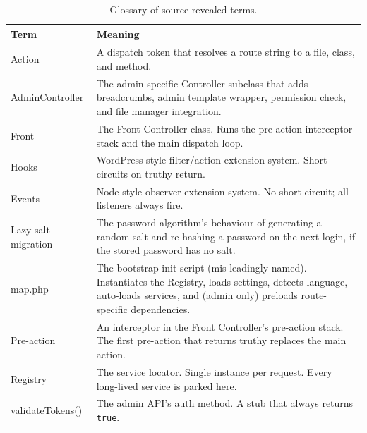 \documentclass[11pt,a4paper]{article}
\begin{document}
\begin{table}[htbp]
\centering
\caption{Glossary of source-revealed terms.}\label{tab:glossary-v2}
\footnotesize\sloppy
\begin{tabularx}{\columnwidth}{>{\raggedright\arraybackslash}p{3.2cm}X}
\toprule
\textbf{Term} & \textbf{Meaning} \\
\midrule
Action & A dispatch token that resolves a route string to a file, class, and method. \\
AdminController & The admin-specific Controller subclass that adds breadcrumbs, admin template wrapper, permission check, and file manager integration. \\
Front & The Front Controller class. Runs the pre-action interceptor stack and the main dispatch loop. \\
Hooks & WordPress-style filter/action extension system. Short-circuits on truthy return. \\
Events & Node-style observer extension system. No short-circuit; all listeners always fire. \\
Lazy salt migration & The password algorithm's behaviour of generating a random salt and re-hashing a password on the next login, if the stored password has no salt. \\
map.php & The bootstrap init script (mis-leadingly named). Instantiates the Registry, loads settings, detects language, auto-loads services, and (admin only) preloads route-specific dependencies. \\
Pre-action & An interceptor in the Front Controller's pre-action stack. The first pre-action that returns truthy replaces the main action. \\
Registry & The service locator. Single instance per request. Every long-lived service is parked here. \\
validateTokens() & The admin API's auth method. A stub that always returns \texttt{true}. \\
\bottomrule
\end{tabularx}
\end{table}
\end{document}
